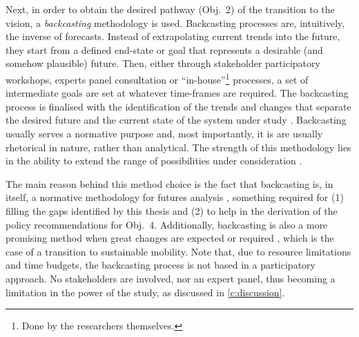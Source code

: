 Next, in order to obtain the desired pathway (Obj.~2) of the transition to the vision, a \emph{backcasting} methodology is used. Backcasting processes are, intuitively, the inverse of forecasts. Instead of extrapolating current trends into the future, they start from a defined end-state or goal that represents a desirable (and somehow plausible) future. Then, either through stakeholder participatory workshops, experts panel consultation or ``in-house''\footnote{Done by the researchers themselves.} processes, a set of intermediate goals are set at whatever time-frames are required. The backcasting process is finalised with the identification of the trends and changes that separate the desired future and the current state of the system under study \parencite{dreborg1996_Essencebackcasting}. Backcasting usually serves a normative purpose and, most importantly, it is are usually rhetorical in nature, rather than analytical. The strength of this methodology lies in the ability to extend the range of possibilities under consideration \parencite{mcdowall2006_Forecastsscenariosvisions}.

The main reason behind this method choice is the fact that backcasting is, in itself, a normative methodology for futures analysis \parencite{boerjeson2006_Scenariotypestechniques,mcdowall2006_Forecastsscenariosvisions}, something required for (1) filling the gaps identified by this thesis and (2) to help in the derivation of the policy recommendations for Obj.~4. Additionally, backcasting is also a more promising method when great changes are expected or required \parencite{hoejer2000_Determinismbackcastingfuture}, which is the case of a transition to sustainable mobility. Note that, due to resource limitations and time budgets, the backcasting process is not based in a participatory approach. No stakeholders are involved, nor an expert panel, thus becoming a limitation in the power of the study, as discussed in \cref{c:discussion}.
